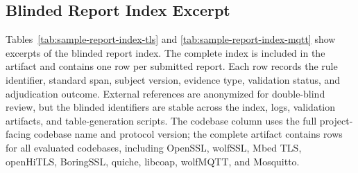 \subsection{Blinded Report Index Excerpt}

Tables~\ref{tab:sample-report-index-tls} and
\ref{tab:sample-report-index-mqtt} show excerpts of the blinded report index.
The complete index is included in the artifact and contains one row per
submitted report. Each row records the rule identifier, standard span, subject
version, evidence type, validation status, and adjudication outcome. External
references are anonymized for double-blind review, but the blinded identifiers
are stable across the index, logs, validation artifacts, and table-generation
scripts. The codebase column uses the full project-facing codebase name and
protocol version; the complete artifact contains rows for all evaluated
codebases, including OpenSSL, wolfSSL, Mbed TLS, openHiTLS, BoringSSL, quiche,
libcoap, wolfMQTT, and Mosquitto.

